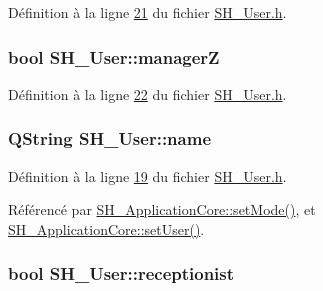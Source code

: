 Définition à la ligne \hyperlink{SH__User_8h_source_l00021}{21} du fichier \hyperlink{SH__User_8h_source}{S\-H\-\_\-\-User.\-h}.

\hypertarget{classSH__User_ad5e987610bea0bd50bbc0a1d1ac0aed5}{
\subsubsection[{manager\-Z}]{\setlength{\rightskip}{0pt plus 5cm}bool S\-H\-\_\-\-User\-::manager\-Z\hspace{0.3cm}{\ttfamily [read]}}}\label{classSH__User_ad5e987610bea0bd50bbc0a1d1ac0aed5}


Définition à la ligne \hyperlink{SH__User_8h_source_l00022}{22} du fichier \hyperlink{SH__User_8h_source}{S\-H\-\_\-\-User.\-h}.

\hypertarget{classSH__User_a18a7ad8ceded0edd3cb93e36cfcd2099}{
\subsubsection[{name}]{\setlength{\rightskip}{0pt plus 5cm}Q\-String S\-H\-\_\-\-User\-::name\hspace{0.3cm}{\ttfamily [read]}}}\label{classSH__User_a18a7ad8ceded0edd3cb93e36cfcd2099}


Définition à la ligne \hyperlink{SH__User_8h_source_l00019}{19} du fichier \hyperlink{SH__User_8h_source}{S\-H\-\_\-\-User.\-h}.



Référencé par \hyperlink{classSH__ApplicationCore_aeb87d289ccc9c8209928f23cf8a02ead}{S\-H\-\_\-\-Application\-Core\-::set\-Mode()}, et \hyperlink{classSH__ApplicationCore_a83d2df40550a95586e70a08833dc5e5f}{S\-H\-\_\-\-Application\-Core\-::set\-User()}.

\hypertarget{classSH__User_ad9970fff1a6be03101fd87f9c60081ee}{
\subsubsection[{receptionist}]{\setlength{\rightskip}{0pt plus 5cm}bool S\-H\-\_\-\-User\-::receptionist\hspace{0.3cm}{\ttfamily [read]}}}\label{classSH__User_ad9970fff1a6be03101fd87f9c60081ee}


